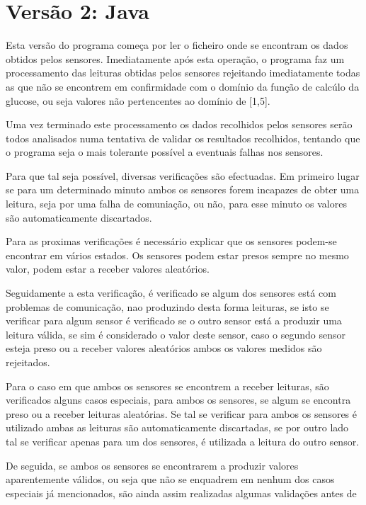 \section{Versão 2: Java}
\label{sec:versao2_java}

Esta versão do programa começa por ler o ficheiro onde se encontram os dados obtidos pelos sensores. Imediatamente após
esta operação, o programa faz um processamento das leituras obtidas pelos sensores rejeitando imediatamente todas as que
não se encontrem em confirmidade com o domínio da função de calcúlo da glucose, ou seja valores não pertencentes ao
domínio de [1,5].\par Uma vez terminado este processamento os dados recolhidos pelos sensores serão todos analisados
numa tentativa de validar os resultados recolhidos, tentando que o programa seja o mais tolerante possível a eventuais
falhas nos sensores.\par Para que tal seja possível, diversas verificações são efectuadas. Em primeiro lugar se para um
determinado minuto ambos os sensores forem incapazes de obter uma leitura, seja por uma falha de comuniação, ou não,
para esse minuto os valores são automaticamente discartados.\par Para as proximas verificações é necessário explicar que
os sensores podem-se encontrar em vários estados. Os sensores podem estar presos sempre no mesmo valor, podem estar a
receber valores aleatórios.\par Seguidamente a esta verificação, é verificado se algum dos sensores está com problemas
de comunicação, nao produzindo desta forma leituras, se isto se verificar para algum sensor é verificado se o outro
sensor está a produzir uma leitura válida, se sim é considerado o valor deste sensor, caso o segundo sensor esteja preso
ou a receber valores aleatórios ambos os valores medidos são rejeitados.\par Para o caso em que ambos os sensores se
encontrem a receber leituras, são verificados alguns casos especiais, para ambos os sensores, se algum se encontra preso
ou a receber leituras aleatórias. Se tal se verificar para ambos os sensores é utilizado ambas as leituras são
automaticamente discartadas, se por outro lado tal se verificar apenas para um dos sensores, é utilizada a leitura do
outro sensor.\par De seguida, se ambos os sensores se encontrarem a produzir valores aparentemente válidos, ou seja que
não se enquadrem em nenhum dos casos especiais já mencionados, são ainda assim realizadas algumas validações antes de
